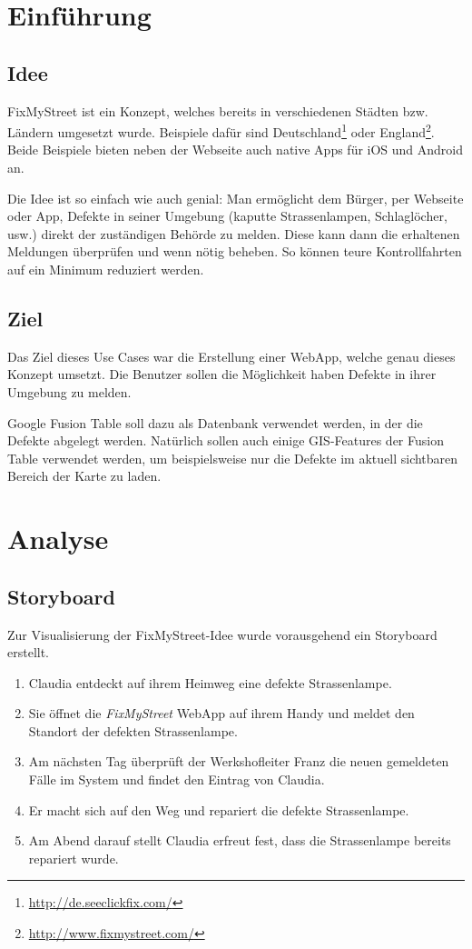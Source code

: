 \section{Einführung}
\subsection{Idee}
FixMyStreet ist ein Konzept, welches bereits in verschiedenen Städten bzw. Ländern umgesetzt wurde. Beispiele dafür sind Deutschland\footnote{\url{http://de.seeclickfix.com/}} oder England\footnote{\url{http://www.fixmystreet.com/}}. Beide Beispiele bieten neben der Webseite auch native Apps für iOS und Android an.

Die Idee ist so einfach wie auch genial: Man ermöglicht dem Bürger, per Webseite oder App, Defekte in seiner Umgebung (kaputte Strassenlampen, Schlaglöcher, usw.) direkt der zuständigen Behörde zu melden. Diese kann dann die erhaltenen Meldungen überprüfen und wenn nötig beheben. So können teure Kontrollfahrten auf ein Minimum reduziert werden.

\subsection{Ziel}
Das Ziel dieses Use Cases war die Erstellung einer \gls{WebApp}, welche genau dieses Konzept umsetzt. Die Benutzer sollen die Möglichkeit haben Defekte in ihrer Umgebung zu melden.

Google Fusion Table soll dazu als Datenbank verwendet werden, in der die Defekte abgelegt werden. Natürlich sollen auch einige \gls{GIS}-Features der Fusion Table verwendet werden, um beispielsweise nur die Defekte im aktuell sichtbaren Bereich der Karte zu laden.

\section{Analyse}

\subsection{Storyboard}
Zur Visualisierung der FixMyStreet-Idee wurde vorausgehend ein Storyboard erstellt.

\begin{enumerate}
\item Claudia entdeckt auf ihrem Heimweg eine defekte Strassenlampe.
\item Sie öffnet die \emph{FixMyStreet} \gls{WebApp} auf ihrem Handy und meldet den Standort der defekten Strassenlampe.
\item Am nächsten Tag überprüft der Werkshofleiter Franz die neuen gemeldeten Fälle im System und findet den Eintrag von Claudia.
\item Er macht sich auf den Weg und repariert die defekte Strassenlampe.
\item Am Abend darauf stellt Claudia erfreut fest, dass die Strassenlampe bereits repariert wurde.
\end{enumerate}

